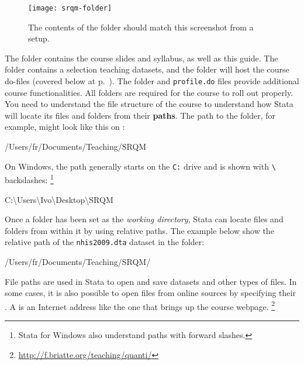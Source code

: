 		\begin{figure}%
		  \texttt{[image: srqm-folder]}
      
		  \caption{The contents of the \SRQM folder should match %
			this screenshot from a \OSX setup.}
		  \label{fig:srqm-folder}
		\end{figure}
		
	The \course folder contains the course slides and syllabus, as well as this guide. The \data folder contains a selection teaching datasets, and the \code folder will host the course do-files (covered below at p.~\pageref{sec:do-files}). The \setup folder and \texttt{profile.do} files provide additional course functionalities. All folders are required for the course to roll out properly.%
	You need to understand the file structure of the course to understand how Stata will locate its files and folders from their \textbf{paths}. The path to the \SRQM folder, for example, might look like this on \OSX:\\[1em]%
	
	\begin{docspec}
		/Users/fr/Documents/Teaching/SRQM
	\end{docspec}
	
	On Windows, the path generally starts on the \texttt{C:} drive and is shown with \texttt{\textbackslash} backslashes:%
		\footnote{Stata for Windows also understand paths with forward slashes.}%
    
	\begin{docspec}
		C:\textbackslash{}Users\textbackslash{}Ivo\textbackslash{}Desktop\textbackslash{}SRQM
	\end{docspec}
	
	Once a folder has been set as the \emph{working directory}, Stata can locate files and folders from within it by using relative paths. The example below show the relative path of the \texttt{nhis2009.dta} dataset in the \texttt{\data} folder:\\[1em]%
	
	\begin{docspec}
		/Users/fr/Documents/Teaching/SRQM/
	\end{docspec}

	File paths are used in Stata to open and save datasets and other types of files. In some cases, it is also possible to open files from online sources by specifying their \URL. A \URL is an Internet address like the one that brings up the course webpage.%
		\footnote{\url{http://f.briatte.org/teaching/quanti/}}%
	

